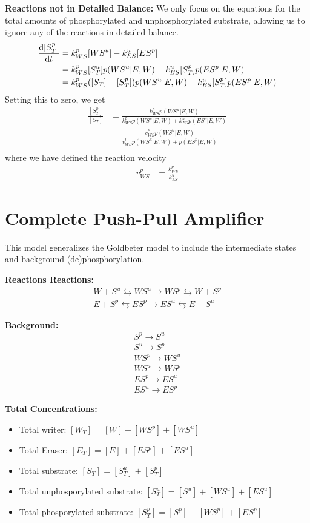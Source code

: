 \documentclass[aps,onecolumn,superscriptaddress,notitlepage]{revtex4-1}
\begin{document}
\textbf{Reactions not in  Detailed Balance:}
We only focus on the equations for the total amounts of phosphorylated and unphosphorylated substrate, allowing us to ignore any of the reactions in detailed balance.
\begin{align}
\dv{[S^p_T]}{t} &= k_{WS}^p[WS^u] - k_{ES}^u[ES^p]\\
&= k_{WS}^p[S^u_T]p(WS^u|E, W) - k_{ES}^u[S^p_T]p(ES^p|E, W)\\
&= k_{WS}^p([S_T]-[S^p_T])p(WS^u|E, W) - k_{ES}^u[S^p_T]p(ES^p|E, W)
\end{align}
Setting this to zero, we get
\begin{align}
\frac{[S_T^p]}{[S_T]} &= \frac{k_{WS}^p p(WS^u|E,W)}{k_{WS}^p p(WS^u|E,W) + k_{ES}^u p(ES^p|E,W)}\\
 &= \frac{v_{WS}^p p(WS^u|E,W)}{v_{WS}^p p(WS^u|E,W) + p(ES^p|E,W)}\\
\end{align}
where we have defined the reaction velocity
\begin{align}
v_{WS}^p &= \frac{k_{WS}^p}{k_{ES}^u}
\end{align}


\section{Complete Push-Pull Amplifier}

This model generalizes the Goldbeter model to include the intermediate states and background (de)phosphorylation.

\textbf{Reactions Reactions:}
\begin{gather}
W + S^u \leftrightarrows WS^u \rightarrow WS^p \leftrightarrows W + S^p\\
E + S^p \leftrightarrows ES^p \rightarrow ES^u \leftrightarrows E + S^u
\end{gather}

\textbf{Background:}
\begin{gather}
S^p \rightarrow S^u\\
S^u \rightarrow S^p\\
WS^p \rightarrow WS^u\\
WS^u \rightarrow WS^p\\
ES^p \rightarrow ES^u\\
ES^u \rightarrow ES^p
\end{gather}


\textbf{Total Concentrations:}
\begin{itemize}
\item Total writer: $[W_T] = [W] + [WS^p] + [WS^u]$
\item Total Eraser: $[E_T] = [E]  + [ES^p] + [ES^u]$
\item Total substrate: $[S_T] = [S^u_T] + [S^p_T]$
\item Total unphosporylated substrate: $[S^u_T] = [S^u] + [WS^u] + [ES^u]$
\item Total phosporylated substrate: $[S^p_T] = [S^p] + [WS^p] + [ES^p]$
\end{itemize}
\end{document}
